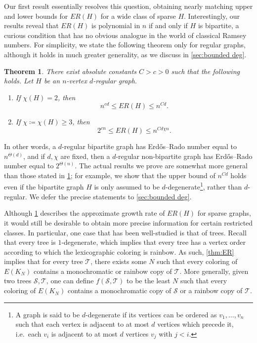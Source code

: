 \documentclass[a4paper,11pt]{article}
\newtheorem{theorem}{\bf Theorem}[section]
\theoremstyle{definition}
\def\cS{\mathcal{S}}
\def\cT{\mathcal{T}}
\begin{document}
Our first result essentially resolves this question, obtaining nearly matching upper and lower bounds for $ER(H)$ for a wide class of sparse $H$. Interestingly, our results reveal that $ER(H)$ is polynomial in $n$ if and only if $H$ is bipartite, a curious condition that has no obvious analogue in the world of classical Ramsey numbers. For simplicity, we state the following theorem only for regular graphs, although it holds in much greater generality, as we discuss in \cref{sec:bounded deg}.
\begin{theorem}\label{thm:ER bounds}
    There exist absolute constants $C>c>0$ such that the following holds. Let $H$ be an $n$-vertex $d$-regular graph.
    \begin{enumerate}
        \item If $\chi(H)=2$, then
        \[
        n^{cd} \leq ER(H) \leq n^{Cd}.
        \]
        \item If $\chi\coloneqq \chi(H)\geq 3$, then
        \[
        2^{cn} \leq ER(H) \leq n^{Cd\chi n}.
        \]
    \end{enumerate}
\end{theorem}
In other words, a $d$-regular bipartite graph has Erd\H os--Rado number equal to $n^{\Theta(d)}$, and if $d,\chi$ are fixed, then a $d$-regular non-bipartite graph has Erd\H os--Rado number equal to $2^{\Theta(n)}$. The actual results we prove are somewhat more general than those stated in \cref{thm:ER bounds}; for example, we show that the upper bound of $n^{Cd}$ holds even if the bipartite graph $H$ is only assumed to be $d$-degenerate\footnote{A graph is said to be $d$-degenerate if its vertices can be ordered as $v_1,\dots,v_n$ such that each vertex is adjacent to at most $d$ vertices which precede it, i.e.\ each $v_i$ is adjacent to at most $d$ vertices $v_j$ with $j<i$.}, rather than $d$-regular. We defer the precise statements to \cref{sec:bounded deg}.

Although \cref{thm:ER bounds} describes the approximate growth rate of $ER(H)$ for sparse graphs, it would still be desirable to obtain more precise information for certain restricted classes. In particular, one case that has been well-studied is that of trees. Recall that every tree is $1$-degenerate, which implies that every tree has a vertex order according to which the lexicographic coloring is rainbow. As such, \cref{thm:ER} implies that for every tree $\cT$, there exists some $N$ such that every coloring of $E(K_N)$ contains a monochromatic or rainbow copy of $\cT$. More generally, given two trees $\cS,\cT$, one can define $f(\cS,\cT)$ to be the least $N$ such that every coloring of $E(K_N)$ contains a monochromatic copy of $\cS$ or a rainbow copy of $\cT$.
\end{document}
